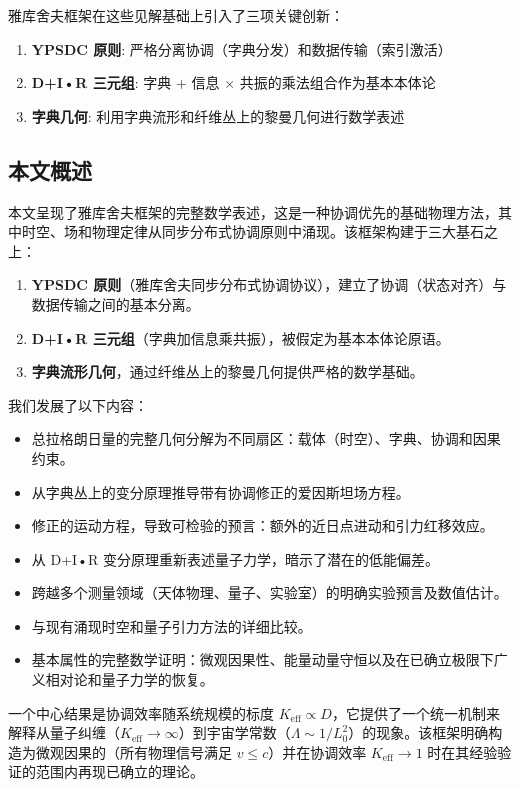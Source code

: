 \documentclass[11pt,a4paper]{article}
\begin{document}
	雅库舍夫框架在这些见解基础上引入了三项关键创新：
	\begin{enumerate}
		\item \textbf{YPSDC 原则}: 严格分离协调（字典分发）和数据传输（索引激活）
		\item \textbf{D+I•R 三元组}: 字典 + 信息 × 共振的乘法组合作为基本本体论
		\item \textbf{字典几何}: 利用字典流形和纤维丛上的黎曼几何进行数学表述
	\end{enumerate}
	
	\subsection{本文概述}
	本文呈现了雅库舍夫框架的完整数学表述，这是一种协调优先的基础物理方法，其中时空、场和物理定律从同步分布式协调原则中涌现。该框架构建于三大基石之上：
	\begin{enumerate}
		\item \textbf{YPSDC 原则}（雅库舍夫同步分布式协调协议），建立了协调（状态对齐）与数据传输之间的基本分离。
		\item \textbf{D+I•R 三元组}（字典加信息乘共振），被假定为基本本体论原语。
		\item \textbf{字典流形几何}，通过纤维丛上的黎曼几何提供严格的数学基础。
	\end{enumerate}
	
	我们发展了以下内容：
	\begin{itemize}
		\item 总拉格朗日量的完整几何分解为不同扇区：载体（时空）、字典、协调和因果约束。
		\item 从字典丛上的变分原理推导带有协调修正的爱因斯坦场方程。
		\item 修正的运动方程，导致可检验的预言：额外的近日点进动和引力红移效应。
		\item 从 D+I•R 变分原理重新表述量子力学，暗示了潜在的低能偏差。
		\item 跨越多个测量领域（天体物理、量子、实验室）的明确实验预言及数值估计。
		\item 与现有涌现时空和量子引力方法的详细比较。
		\item 基本属性的完整数学证明：微观因果性、能量动量守恒以及在已确立极限下广义相对论和量子力学的恢复。
	\end{itemize}
	
	一个中心结果是协调效率随系统规模的标度 $K_{\mathrm{eff}} \propto D$，它提供了一个统一机制来解释从量子纠缠（$K_{\mathrm{eff}} \to \infty$）到宇宙学常数（$\Lambda \sim 1/L_0^2$）的现象。该框架明确构造为微观因果的（所有物理信号满足 $v \leq c$）并在协调效率 $K_{\mathrm{eff}} \to 1$ 时在其经验验证的范围内再现已确立的理论。
	
\end{document}
